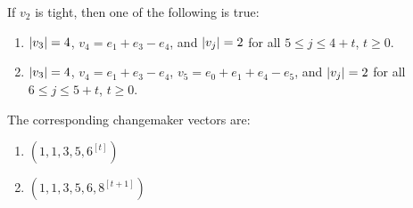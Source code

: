 \begin{prop}\label{lem:k1=1,k2=2,v2tight}
	If $v_2$ is tight, then one of the following is true: 
	\begin{enumerate}
		\item $\lvert v_3 \rvert = 4$, $v_4 = e_1 + e_3 - e_4$, and $\lvert v_j \rvert = 2$ for all $5\leq j \leq 4+t$, $t\geq 0$. 
		\item $\lvert v_3 \rvert = 4$, $v_4 = e_1 + e_3 - e_4$, $v_5 = e_0 + e_1 +e_4-e_5$, and $\lvert v_j \rvert = 2$ for all $6\leq j \leq 5 + t$, $t \geq 0$. 
	\end{enumerate}
	The corresponding changemaker vectors are:
	\begin{enumerate}
		\item $(1,1,3,5,6^{[t]})$
		\item $(1,1,3,5,6,8^{[t+1]})$
	\end{enumerate}
\end{prop}
